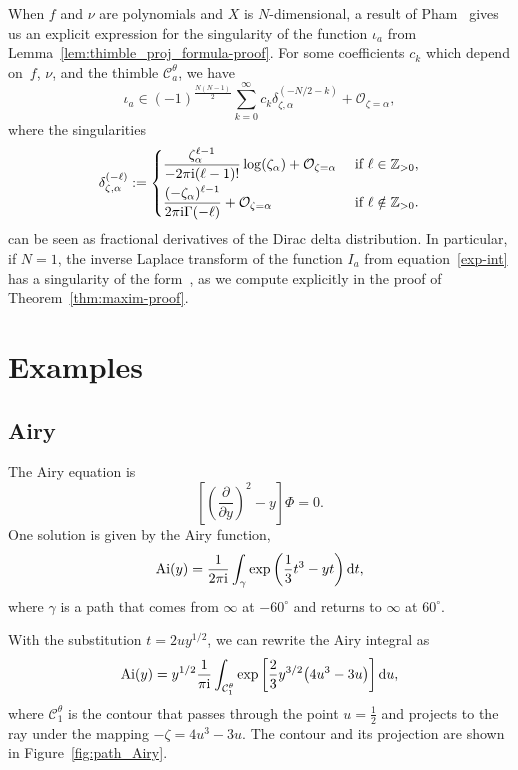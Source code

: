\documentclass[pdftex]{sigma}
\newcommand{\Z}{\mathbb{Z}}
\DeclareMathOperator{\Ai}{Ai}
\numberwithin{equation}{section}
\begin{document}
\begin{Remark}\label{rmk:Pham formula}
When $f$ and $\nu$ are polynomials and $X$ is $N$-dimensional, a result of Pham~\cite[equation~(2.4), 2\`{e}me Partie]{pham} gives us an explicit expression for the singularity of the function $\iota_a$ from Lemma~\ref{lem:thimble_proj_formula-proof}. For some coefficients $c_k$ which depend on~$f$, $\nu$, and the thimble $\mathcal{C}_a^\theta$, we have
\[%
\iota_a \in (-1)^{\frac{N(N-1)}{2}} \sum_{k=0}^\infty c_k \delta_{\zeta, \alpha}^{(-N/2 - k)} + \mathcal{O}_{\zeta = \alpha},
\]
where the singularities
\begin{equation*}
\delta_{\zeta,\alpha}^{(-\ell)}:=\begin{cases}
\displaystyle\frac{\zeta_\alpha^{\ell-1}}{-2 \pi {\rm i}(\ell-1)!}\log(\zeta_\alpha)+ \mathcal{O}_{\zeta = \alpha} & \text{ if } \ell \in \Z_{> 0},\vspace{1mm}\\
\displaystyle\frac{(-\zeta_\alpha)^{\ell-1}}{2 \pi {\rm i} \Gamma(-\ell)}+ \mathcal{O}_{\zeta = \alpha} & \text{ if } \ell \notin \Z_{> 0} .
\end{cases}
\end{equation*}
can be seen as fractional derivatives of the Dirac delta distribution. In particular, if $N=1$, the inverse Laplace transform of the function $I_a$ from equation~\eqref{exp-int} has a singularity of the form~, as we compute explicitly in the proof of Theorem~\ref{thm:maxim-proof}.
\end{Remark}
\section{Examples}\label{sec:examples}
%
\subsection{Airy}\label{sec:airy}
%
The Airy equation is
\[
\left[\left(\frac{\partial}{\partial y}\right)^2 - y\right] \Phi = 0.
\]
One solution is given by the Airy function,
\[ \Ai(y) = \frac{1}{2 \pi {\rm i}} \int_\gamma \exp\left(\frac{1}{3}t^3 - yt\right) {\rm d}t, \]
where $\gamma$ is a path that comes from $\infty$ at $-60^\circ$ and returns to $\infty$ at $60^\circ$.

With the substitution $t = 2uy^{1/2}$, we can rewrite the Airy integral as
\begin{equation}\label{eqn:airy-distillation}
\Ai(y) = y^{1/2} \frac{1}{ \pi {\rm i}} \int_{\mathcal{C}^\theta_1} \exp\left[\frac{2}{3}y^{3/2} \bigl(4u^3 - 3u\bigr)\right] {\rm d}u,
\end{equation}
where $\mathcal{C}^\theta_1$ is the contour that passes through the point $u = \frac{1}{2}$ and projects to the ray  under the mapping $-\zeta = 4u^3 - 3u$. The contour and its projection are shown in Figure~\ref{fig:path_Airy}.
\end{document}
